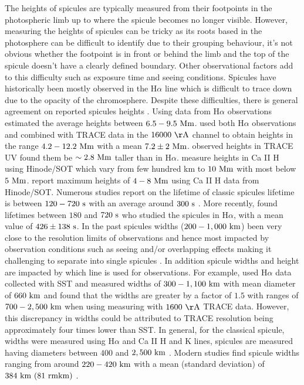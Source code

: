 \documentclass[12pt]{ociamthesis}
\newcommand{\np}{\\ \\}
\begin{document}
%
The heights of spicules are typically measured from their footpoints in the photospheric limb up to where the spicule becomes no longer visible. However, measuring the heights of spicules can be tricky as its roots based in the photosphere can be difficult to identify due to their grouping behaviour, it's not obvious whether the footpoint is in front or behind the limb and the top of the spicule doesn't have a clearly defined boundary. Other observational factors add to this difficulty such as exposure time and seeing conditions. Spicules have historically been mostly observed in the H$\alpha$ line which is difficult to trace down due to the opacity of the chromosphere. Despite these difficulties, there is general agreement on reported spicules heights \citep{Tsiropoula2012}. Using data from H$\alpha$ observations \cite{Beckers1972ARA&A,Beckers1968} estimated the average heights between $6.5-9.5~\rm{Mm}$. \cite{Pasachoff2009SoPh26059P} used both H$\alpha$ observations and combined with TRACE data in the $16000~\rm{ \AA}$ channel to obtain heights in the range $4.2-12.2~\rm{Mm}$ with a mean $7.2\pm2~\rm{Mm}$. \cite{Pasachoff2009SoPh26059P} observed heights in TRACE UV found them be $\sim 2.8~\rm{Mm}$ taller than in H$\alpha$. \cite{Pontieu2007PASJ} measure heights in Ca II H using Hinode/SOT which vary from few hundred km to $10~\rm{Mm}$ with most below $5~\rm{Mm}$. \cite{Pereira2012} report maximum heights of $4-8~\rm{Mm}$ using Ca II H data from Hinode/SOT. Numerous studies report on the lifetime of classic spicules lifetime is between $120-720~\rm{s}$ with an average around $300~\rm{s}$ \citep{Roberts1945ApJ,Rush1954AuJPh7230R, Lippincott1957SCoA215L, Alissandrakis1971SoPh2047A, Cook1984AdSpR459C, Georgakilas1999AA341610G}. More recently, \cite{Pasachoff2009SoPh26059P} found lifetimes between $180$ and $720~\rm{s}$ who studied the spicules in H$\alpha$, with a mean value of $426\pm138~\rm{s}$.
% 
In the past spicules widths ($200-1,000~\rm{km}$) been very close to the resolution limits of observations and hence most impacted by observation conditions such as seeing and/or overlapping effects making it challenging to separate into single spicules \citep{Pontieu2007ASPC, Tsiropoula2012}. In addition spicule widths and height are impacted by which line is used for observations. For example, \cite{Pasachoff2009SoPh26059P} used H$\alpha$ data collected with SST and measured widths of $300-1,100~\rm{km}$ with mean diameter of $660~\rm{km}$ and found that the widths are greater by a factor of $1.5$ with ranges of $700-2,500~\rm{km}$ when using measuring with $1600~\rm{\AA}$ TRACE data. However, this discrepancy in widths could be attributed to TRACE resolution being approximately four times lower than SST. In general, for the classical spicule, widths were measured using H$\alpha$ and Ca II H and K lines, spicules are measured having diameters between $400$ and $2,500~\rm{km}$ \cite{Beckers1968, Dunn1960Obs8031D, Beckers1972ARA&A, Lynch1973SoPh3063L}. Modern studies find spicule widths ranging from around $220-420~\rm{km}$ with a mean (standard deviation) of $384~\rm{km}~(81~rm{km})$ \cite{Pereira2012}. \np
\end{document}
